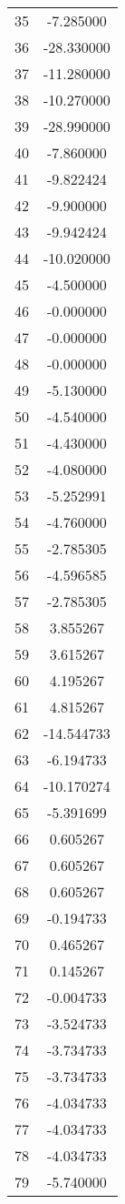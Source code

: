\documentclass[12pt]{article}
\begin{document}
\begin{longtable}{@{}cc@{}}
35 & -7.285000 \\
36 & -28.330000 \\
37 & -11.280000 \\
38 & -10.270000 \\
39 & -28.990000 \\
40 & -7.860000 \\
41 & -9.822424 \\
42 & -9.900000 \\
43 & -9.942424 \\
44 & -10.020000 \\
45 & -4.500000 \\
46 & -0.000000 \\
47 & -0.000000 \\
48 & -0.000000 \\
49 & -5.130000 \\
50 & -4.540000 \\
51 & -4.430000 \\
52 & -4.080000 \\
53 & -5.252991 \\
54 & -4.760000 \\
55 & -2.785305 \\
56 & -4.596585 \\
57 & -2.785305 \\
58 & 3.855267 \\
59 & 3.615267 \\
60 & 4.195267 \\
61 & 4.815267 \\
62 & -14.544733 \\
63 & -6.194733 \\
64 & -10.170274 \\
65 & -5.391699 \\
66 & 0.605267 \\
67 & 0.605267 \\
68 & 0.605267 \\
69 & -0.194733 \\
70 & 0.465267 \\
71 & 0.145267 \\
72 & -0.004733 \\
73 & -3.524733 \\
74 & -3.734733 \\
75 & -3.734733 \\
76 & -4.034733 \\
77 & -4.034733 \\
78 & -4.034733 \\
79 & -5.740000 \\

\end{longtable}
\end{document}
